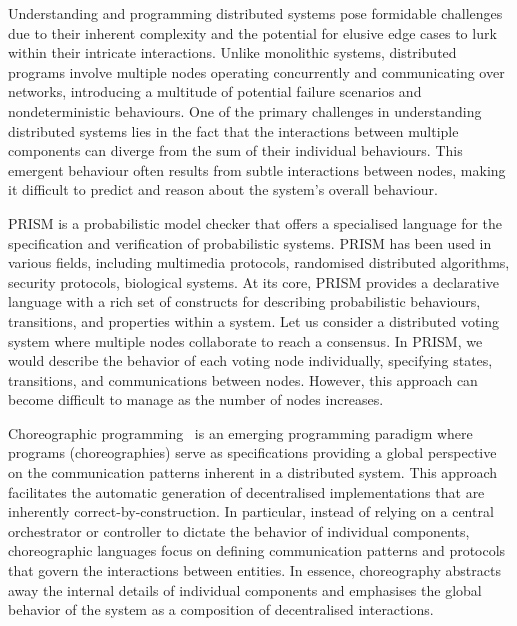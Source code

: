 Understanding and programming distributed systems pose formidable
challenges due to their inherent complexity and the potential for
elusive edge cases to lurk within their intricate interactions. Unlike
monolithic systems, distributed programs involve multiple nodes
operating concurrently and communicating over networks, introducing a
multitude of potential failure scenarios and nondeterministic
behaviours.
%
One of the primary challenges in understanding distributed systems
lies in the fact that the interactions between multiple components can
diverge from the sum of their individual behaviours. This emergent
behaviour often results from subtle interactions between nodes, making
it difficult to predict and reason about the system's overall
behaviour.

PRISM \cite{PRISMdoc} is a probabilistic model checker that offers a
specialised language for the specification and verification of
probabilistic systems. PRISM has been used in various fields,
including multimedia protocols, randomised distributed algorithms,
security protocols, biological systems.  At its core, PRISM provides a
declarative language with a rich set of constructs for describing
probabilistic behaviours, transitions, and properties within a system.
Let us consider a distributed voting system where
multiple nodes collaborate to reach a consensus. In PRISM, we would
describe the behavior of each voting node individually, specifying
states, transitions, and communications between
nodes. However, this approach can become difficult to manage as the
number of nodes increases.

%

Choreographic programming~\cite{M23} is an emerging programming
paradigm where programs (choreographies) serve as specifications
providing a global perspective on the communication patterns inherent
in a distributed system. This approach facilitates the automatic
generation of decentralised implementations that are inherently
correct-by-construction.
%
In particular, instead of relying on a central orchestrator or
controller to dictate the behavior of individual components,
choreographic languages focus on defining communication patterns and
protocols that govern the interactions between entities.
%
In essence, choreography abstracts away the internal details of
individual components and emphasises the global behavior of the system
as a composition of decentralised interactions. %
%

